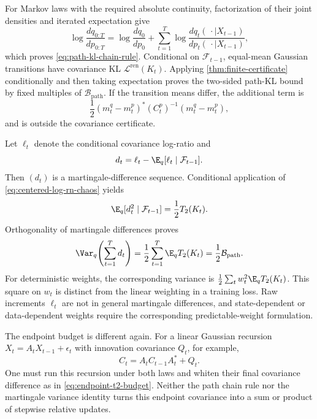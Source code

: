 For Markov laws with the required absolute continuity, factorization of their
joint densities and iterated expectation give
\begin{equation}
  \log\frac{dq_{0:T}}{dp_{0:T}}
  =\log\frac{dq_0}{dp_0}
   +\sum_{t=1}^T
    \log\frac{dq_t(\,\cdot\mid X_{t-1})}
             {dp_t(\,\cdot\mid X_{t-1})},
  \label{eq:path-kl-chain-rule}
\end{equation}
which proves \cref{eq:path-kl-chain-rule}. Conditional on
$\mathcal F_{t-1}$, equal-mean Gaussian transitions have covariance KL
$\mathcal L^{\mathrm{ren}}(K_t)$. Applying
\cref{thm:finite-certificate} conditionally and then taking expectation
proves the two-sided path-KL bound by fixed multiples of
$\mathcal B_{\mathrm{path}}$. If the transition means differ, the additional
term is
\begin{equation}
  \frac12(m_t^q-m_t^p)^\ast(C_t^p)^{-1}(m_t^q-m_t^p),
\end{equation}
and is outside the covariance certificate.

Let $\ell_t$ denote the conditional covariance log-ratio and
\begin{equation}
  d_t=\ell_t-\E_q[\ell_t\mid\mathcal F_{t-1}].
\end{equation}
Then $(d_t)$ is a martingale-difference sequence. Conditional application of
\cref{eq:centered-log-rn-chaos} yields
\begin{equation}
  \E_q[d_t^2\mid\mathcal F_{t-1}]
  =\frac12\Ttwo(K_t).
\end{equation}
Orthogonality of martingale differences proves
\begin{equation}
  \Var_q\!\left(\sum_{t=1}^Td_t\right)
  =\frac12\sum_{t=1}^T\E_q\Ttwo(K_t)
  =\frac12\mathcal B_{\mathrm{path}}.
\end{equation}
For deterministic weights, the corresponding variance is
$\frac12\sum_t w_t^2\E_q\Ttwo(K_t)$. This square on $w_t$ is distinct from
the linear weighting in a training loss. Raw increments $\ell_t$ are not in
general martingale differences, and state-dependent or data-dependent weights
require the corresponding predictable-weight formulation.

The endpoint budget is different again. For a linear Gaussian recursion
$X_t=A_tX_{t-1}+\epsilon_t$ with innovation covariance $Q_t$, for example,
\begin{equation}
  C_t=A_tC_{t-1}A_t^\ast+Q_t.
\end{equation}
One must run this recursion under both laws and whiten their final covariance
difference as in \cref{eq:endpoint-t2-budget}. Neither the path chain rule nor
the martingale variance identity turns this endpoint covariance into a sum or
product of stepwise relative updates.


